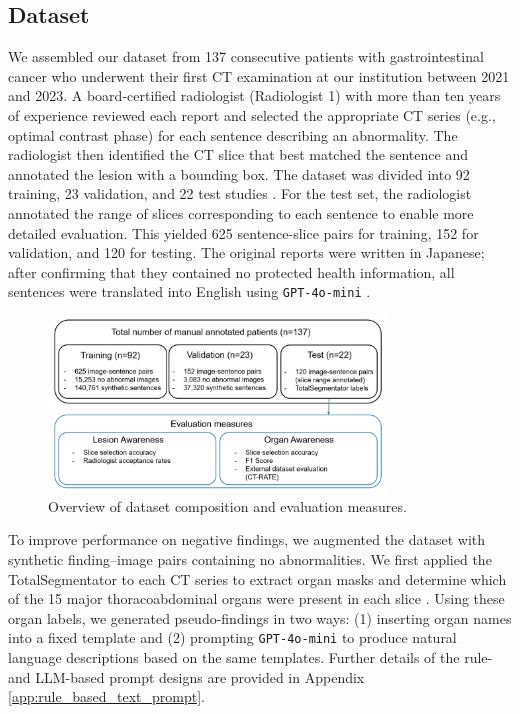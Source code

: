 \documentclass[bioengineering,article,submit,pdftex,moreauthors]{Definitions/mdpi}
\begin{document}
\subsection{Dataset}\label{sec:dataset}
We assembled our dataset from 137 consecutive patients with gastrointestinal cancer who underwent their ﬁrst CT examination at our institution between 2021 and 2023. 
A board-certified radiologist (Radiologist 1) with more than ten years of experience reviewed each report and selected the appropriate CT series (e.g., optimal contrast phase) for each sentence describing an abnormality. 
The radiologist then identified the CT slice that best matched the sentence and annotated the lesion with a bounding box. 
The dataset was divided into 92 training, 23 validation, and 22 test studies . 
For the test set, the radiologist annotated the range of slices corresponding to each sentence to enable more detailed evaluation. 
This yielded 625 sentence-slice pairs for training, 152 for validation, and 120 for testing. 
The original reports were written in Japanese; after confirming that they contained no protected health information, all sentences were translated into English using \texttt{GPT-4o-mini} \cite{openai_gpt-4_2024}. 


\begin{figure}[ht]
  \centering
  \includegraphics[width=0.8\textwidth]{./figures/dataset_detail_1.png}
  \caption{
     Overview of dataset composition and evaluation measures.
  }
  \label{fig:dataset_detail}
\end{figure}


To improve performance on negative findings, we augmented the dataset with synthetic finding–image pairs containing no abnormalities. 
We first applied the TotalSegmentator to each CT series to extract organ masks and determine which of the 15 major thoracoabdominal organs were present in each slice \cite{wasserthal_totalsegmentator_2023}. 
Using these organ labels, we generated pseudo-findings in two ways: (1) inserting organ names into a fixed template and (2) prompting \texttt{GPT-4o-mini} to produce natural language descriptions based on the same templates. 
Further details of the rule- and LLM-based prompt designs are provided in Appendix \ref{app:rule_based_text_prompt}.
\end{document}
